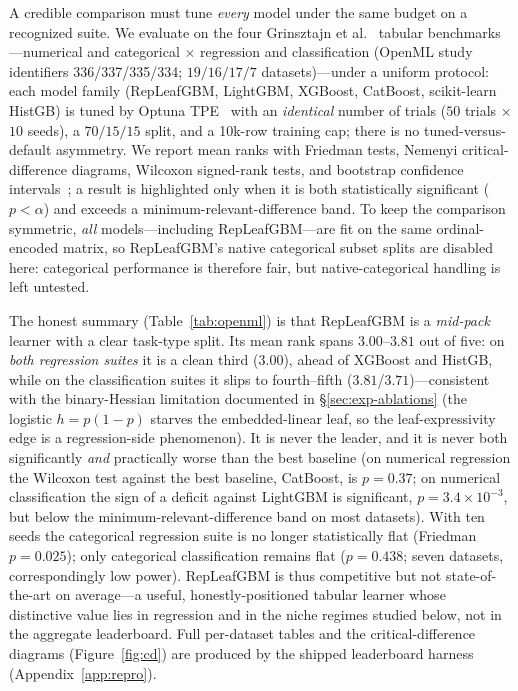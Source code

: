\documentclass[11pt]{article}
\begin{document}
A credible comparison must tune \emph{every} model under the same budget on a recognized
suite. We evaluate on the four Grinsztajn et al.~\citep{grinsztajn2022why} tabular
benchmarks---numerical and categorical $\times$ regression and classification (OpenML
study identifiers 336/337/335/334; $19/16/17/7$ datasets)---under a uniform protocol: each
model family (RepLeafGBM, LightGBM, XGBoost, CatBoost, scikit-learn HistGB) is tuned by
Optuna TPE~\citep{akiba2019optuna} with an \emph{identical} number of trials ($50$ trials
$\times$ $10$ seeds), a $70/15/15$ split, and a 10k-row training cap; there is no
tuned-versus-default asymmetry. We report mean ranks with Friedman tests, Nemenyi
critical-difference diagrams, Wilcoxon signed-rank tests, and bootstrap confidence
intervals~\citep{demsar2006statistical}; a result is highlighted only when it is both
statistically significant ($p<\alpha$) and exceeds a minimum-relevant-difference band.
To keep the comparison symmetric, \emph{all} models---including RepLeafGBM---are fit on the
same ordinal-encoded matrix, so RepLeafGBM's native categorical subset splits are disabled
here: categorical performance is therefore fair, but native-categorical handling is left
untested.

The honest summary (Table~\ref{tab:openml}) is that RepLeafGBM is a \emph{mid-pack}
learner with a clear task-type split. Its mean rank spans $3.00$--$3.81$ out of five: on
\emph{both regression suites} it is a clean third ($3.00$), ahead of XGBoost and HistGB,
while on the classification suites it slips to fourth--fifth ($3.81$/$3.71$)---consistent
with the binary-Hessian limitation documented in \S\ref{sec:exp-ablations} (the logistic
$h=p(1-p)$ starves the embedded-linear leaf, so the leaf-expressivity edge is a
regression-side phenomenon). It is never the leader, and it is never both significantly
\emph{and} practically worse than the best baseline (on numerical regression the Wilcoxon
test against the best baseline, CatBoost, is $p=0.37$; on numerical classification the
sign of a deficit against LightGBM is significant, $p=3.4\times10^{-3}$, but below the
minimum-relevant-difference band on most datasets). With ten seeds the categorical
regression suite is no longer statistically flat (Friedman $p=0.025$); only
categorical classification remains flat ($p=0.438$; seven datasets, correspondingly
low power). RepLeafGBM is thus competitive but not state-of-the-art on average---a
useful, honestly-positioned tabular learner whose distinctive value lies in regression
and in the niche regimes studied below, not in the aggregate leaderboard. Full
per-dataset tables and the critical-difference diagrams (Figure~\ref{fig:cd}) are
produced by the shipped leaderboard harness (Appendix~\ref{app:repro}).
\end{document}
